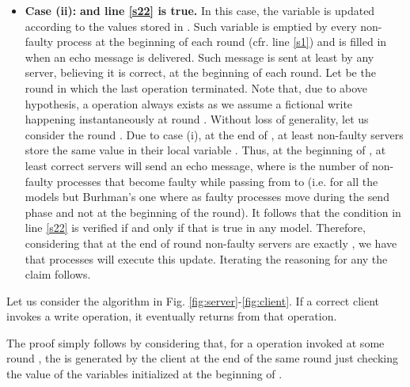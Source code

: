 \begin{proofL}
\begin{itemize}
\item {\bf Case (ii):}  {\bf and line \ref{s22} is true.} In this case, the  variable is updated according to the values stored in . Such variable is emptied by every non-faulty process at the beginning of each round (cfr. line \ref{s1}) and is filled in when an {\sc echo} message is delivered.
Such message is sent at least by any server, believing it is correct, at the beginning of each round.
Let  be the round in which the last  operation terminated. Note that, due to above hypothesis, a  operation always exists as we assume a fictional write happening instantaneously at round . Without loss of generality, let us consider the round .
Due to case (i), at the end of , at least  non-faulty servers store the same value  in their local variable .
Thus, at the beginning of , at least  correct servers will send an {\sc echo} message, where  is the number of non-faulty processes that become faulty while passing from  to  (i.e.  for all the models but Burhman's one where  as faulty processes move during the send phase and not at the beginning of the round).
It follows that the condition in line \ref{s22} is verified if and only if  that is true in any model.
Therefore, considering that at the end of round  non-faulty servers are exactly , we have that  processes will execute this update.
Iterating the reasoning for any  the claim follows.

\end{itemize}


\renewcommand{\toto}{l:consistencyEndGBS}
\end{proofL}














\begin{lemma}\label{l:writeTermination}
Let us consider the algorithm in Fig. \ref{fig:server}-\ref{fig:client}. If a correct client invokes a {\sf write} operation, it eventually returns from that operation. 
\end{lemma}

\begin{proofL}
	The proof simply follows by considering that, for a  operation invoked at some round ,  the  is generated by the client at the end of the same round just checking the value of the variables initialized at the beginning of .
\renewcommand{\toto}{l:writeTermination}
\end{proofL}
	
